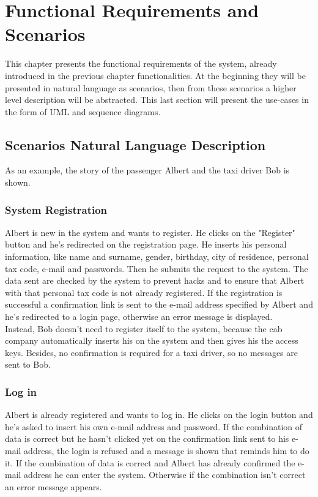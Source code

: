 \chapter{Functional Requirements and Scenarios}

\setmyfancystyle

\label{reqs}
This chapter presents the functional requirements of the system, already introduced in the previous chapter functionalities. At the beginning they will be presented in natural language as scenarios, then from these scenarios a higher level description will be abstracted. This last section will present the use-cases in the form of UML and sequence diagrams.

\section{Scenarios Natural Language Description}
As an example, the story of the \gls{passenger} Albert and the taxi \gls{driver} Bob is shown.

\subsection{System Registration}
Albert is new in the system and wants to register. He clicks on the "Register" button and he's redirected on the registration page. He inserts his personal information, like name and surname, gender, birthday, city of residence, personal tax code, e-mail and passwords. Then he submits the request to the system. The data sent are checked by the system to prevent hacks and to ensure that Albert with that personal tax code is not already registered. If the registration is successful a confirmation link is sent to the e-mail address specified by Albert and he's redirected to a login page, otherwise an error message is displayed.\\
Instead, Bob doesn't need to register itself to the system, because the cab company automatically inserts his on the system and then gives his the access keys. Besides, no confirmation is required for a taxi \gls{driver}, so no messages are sent to Bob.

\subsection{Log in}
Albert is already registered and wants to log in. He clicks on the login button and he's asked to insert his own e-mail address and password. If the combination of data is correct but he hasn't clicked yet on the confirmation link sent to his e-mail address, the login is refused and a message is shown that reminds him to do it. If the combination of data is correct and Albert has already confirmed the e-mail address he can enter the system. Otherwise if the combination isn't correct an error message appears.

